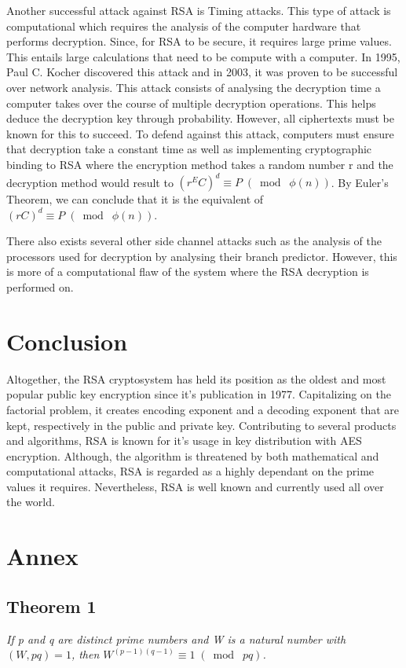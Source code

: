 \documentclass{article}
\begin{document}
\quad \quad Another successful attack against RSA is Timing attacks. This type of attack is computational which requires the analysis of the computer hardware that performs decryption. Since, for RSA to be secure, it requires large prime values. This entails large calculations that need to be compute with a computer. In 1995, Paul C. Kocher discovered this attack and in 2003, it was proven to be successful over network analysis. This attack consists of analysing the decryption time a computer takes over the course of multiple decryption operations. This helps deduce the decryption key through probability. However, all ciphertexts must be known for this to succeed. To defend against this attack, computers must ensure that decryption take a constant time as well as implementing cryptographic binding to RSA where the encryption method takes a random number r and the decryption method would result to $(r^EC)^d \equiv P \;(\bmod\; \phi(n))$. By Euler's Theorem, we can conclude that it is the equivalent of $(rC)^d \equiv P \;(\bmod\; \phi(n))$.

There also exists several other side channel attacks such as the analysis of the processors used for decryption by analysing their branch predictor. However, this is more of a computational flaw of the system where the RSA decryption is performed on. 

\section{Conclusion}

Altogether, the RSA cryptosystem has held its position as the oldest and most popular public key encryption since it's publication in 1977. Capitalizing on the factorial problem, it creates encoding exponent and a decoding exponent that are kept, respectively in the public and private key. Contributing to several products and algorithms, RSA is known for it's usage in key distribution with AES encryption. Although, the algorithm is threatened by both mathematical and computational attacks, RSA is regarded as a highly dependant on the prime values it requires. Nevertheless, RSA is well known and currently used all over the world.

\newpage
\section{Annex} \label{Ann}

\subsection{Theorem 1} \label{4.1}
\quad \textit{If p and q are distinct prime numbers and W is a natural number with $(W, pq) = 1$, then $W^{(p-1)(q-1)} \equiv 1 \;(\bmod\; pq)$.}
\end{document}

